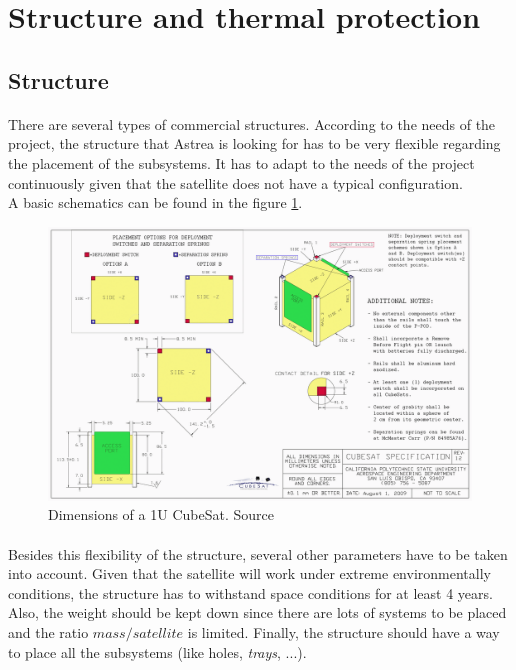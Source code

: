 \section{Structure and thermal protection}
\subsection{Structure}
\paragraph{}There are several types of commercial structures. According to the needs of the project, the structure that Astrea is looking for has to be very flexible regarding the placement of the subsystems. It has to adapt to the needs of the project continuously given that the satellite does not have a typical configuration.\\
A basic schematics can be found in the figure \ref{epsschematics}.

\begin{figure}[h!]
\includegraphics[scale=0.6]{./sections/SatelliteDept/sections/images/CubeSatDesign}
\centering
\caption{Dimensions of a 1U CubeSat. Source \cite{cubesatdimensions}}
\label{epsschematics}
\end{figure}

\paragraph{}Besides this flexibility of the structure, several other parameters have to be taken into account. Given that the satellite will work under extreme environmentally conditions, the structure has to withstand space conditions for at least 4 years. Also, the weight should be kept down since there are lots of systems to be placed and the ratio $ mass / satellite $ is limited. Finally, the structure should have a way to place all the subsystems (like holes, \textit{trays}, ...).

